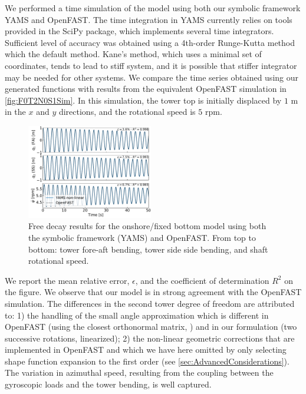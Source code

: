\documentclass[wes, manuscript]{copernicus}
\begin{document}
We performed a time simulation of the model using both our symbolic framework YAMS and OpenFAST.
The time integration in YAMS currently relies on tools provided in the SciPy package, which implements several time integrators.   Sufficient level of accuracy was obtained using a 4th-order Runge-Kutta method which the default method. Kane's method, which uses a minimal set of coordinates, tends to lead to stiff system, and it is possible that stiffer integrator may be needed for other systems.
We compare the time series obtained using our generated functions with results from the equivalent OpenFAST simulation in \autoref{fig:F0T2N0S1Sim}. In this simulation, the tower top is initially displaced by $1$ \unit{m} in the $x$ and $y$ directions, and the rotational speed is $5$ \unit{rpm}.
\noindent\begin{figure}[!htb]\centering%
  \includegraphics[width=0.49\textwidth]{figs/F0T2N0S1Sim}
  \caption{Free decay results for the onshore/fixed bottom model using both the symbolic framework (YAMS) and OpenFAST. From top to bottom: tower fore-aft bending, tower side side bending, and shaft rotational speed.}\label{fig:F0T2N0S1Sim}%
\end{figure}
We report the mean relative error, $\epsilon$, and the coefficient of determination $R^2$ on the figure.
We observe that our model is in strong agreement with the OpenFAST simulation. The differences in the second tower degree of freedom are attributed to: 1) the handling of the small angle approximation which is different in OpenFAST (using the closest orthonormal matrix, \cite{Jonkman:2009}) and in our formulation (two successive rotations, linearized); 2) the non-linear geometric corrections that are implemented in OpenFAST and which we have here omitted by only selecting shape function expansion to the first order (see \autoref{sec:AdvancedConsiderations}). 
The variation in azimuthal speed, resulting from the coupling between the gyroscopic loads and the tower bending, is well captured. 
\end{document}
